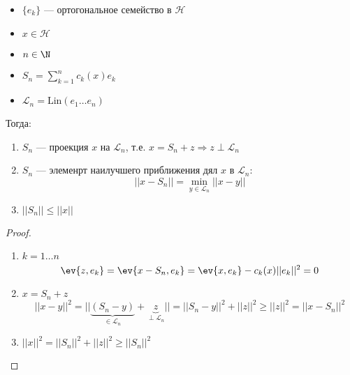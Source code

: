 \begin{theorem}\itemfix
    \begin{itemize}
        \item \(\{e_k\} \) --- ортогональное семейство в \(\mathcal{H}\)
        \item \(x \in \mathcal{H}\)
        \item \(n \in \N\)
        \item \(S_n = \sum_{k = 1}^n c_k(x) e_k\)
        \item \(\mathcal{L}_n = \text{Lin}(e_1 \dots e_n)\)
    \end{itemize}

    Тогда:
    \begin{enumerate}
        \item \(S_n\) --- проекция \(x\) на \(\mathcal{L}_n\), т.е. \(x = S_n + z \Rightarrow z \perp \mathcal{L}_n\)
        \item \(S_n\) --- элеменрт наилучшего приближения дял \(x\) в \(\mathcal{L}_n\):
              \[||x - S_n|| = \min_{y \in \mathcal{L}_n} ||x - y||\]
        \item \(||S_n|| \leq ||x||\)
    \end{enumerate}
\end{theorem}
\begin{proof}\itemfix
    \begin{enumerate}
        \item \(k = 1\dots n\)
              \[\ev{z, e_k} = \ev{x - S_n, e_k} = \ev{x, e_k} - c_k(x) ||e_k||^2 = 0\]
        \item \(x = S_n + z\)
              \[||x - y||^2 = ||\underbrace{(S_n - y)}_{\in \mathcal{L}_n} + \underbrace{z}_{\perp \mathcal{L}_n}|| = ||S_n - y||^2 + ||z||^2 \geq ||z||^2 = ||x - S_n||^2\]
        \item \(||x||^2 = ||S_n||^2 + ||z||^2 \geq ||S_n||^2\)
    \end{enumerate}
\end{proof}